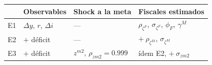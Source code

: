 \begin{tabular}{@{}llll@{}}
\toprule
 & Observables & Shock a la meta & Fiscales estimados \\
\midrule
E1 & $\Delta y$, $r$, $\Delta i$
   & ---
   & $\rho_{\zeta^F}$, $\sigma_{\zeta^F}$, $\phi_F$, $\gamma^M$ \\[3pt]
E2 & $+$ déficit
   & ---
   & $+\ \rho_{\zeta^M}$, $\sigma_{\zeta^M}$ \\[3pt]
E3 & $+$ déficit
   & $z^{m2}$, $\rho_{zm2}=0.999$
   & ídem E2, $+\ \sigma_{zm2}$ \\
\bottomrule
\end{tabular}
